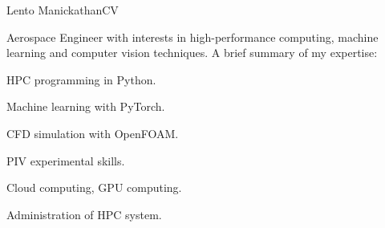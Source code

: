 \documentclass[11pt, a4paper]{preamble/awesome-cv-novo}
\begin{document}
\makecvheader[L]

\makecvfooter
  {Lento Manickathan\enskip\textbar\enskip CV}
  {}
  {\thepage}




\begin{cvparagraph}

Aerospace Engineer with interests in high-performance computing, machine learning and computer vision techniques. A brief summary of my expertise:

\begin{cventries}
    \begin{cvitems}
      \item {HPC programming in Python.}
      \item {Machine learning with PyTorch.}
      \item {CFD simulation with OpenFOAM.}
      \item {PIV experimental skills.}
      \item {Cloud computing, GPU computing.}
      \item {Administration of HPC system.}
    \end{cvitems}
\end{cventries}

\end{cvparagraph}

\vspace{4mm}


\end{document}
